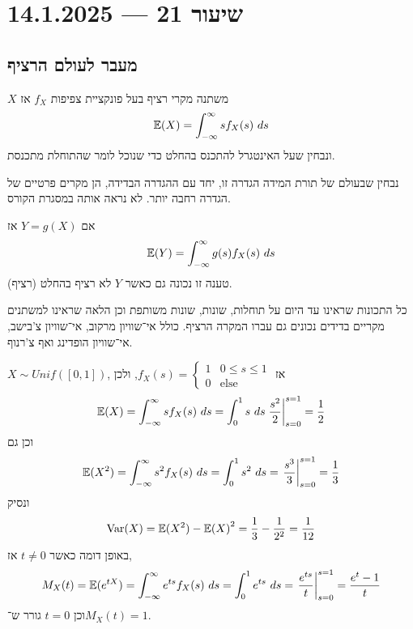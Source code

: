 \section{שיעור 21 --- 14.1.2025}
\subsection{מעבר לעולם הרציף}
\begin{definition}
	$X$ משתנה מקרי רציף בעל פונקציית צפיפות $f_X$ אז
	\[
		\mathbb{E}(X)
		= \int_{-\infty}^{\infty} s f_X(s)\ ds
	\]
	ונבחין שעל האינטגרל להתכנס בהחלט כדי שנוכל לומר שהתוחלת מתכנסת.
\end{definition}
נבחין שבעולם של תורת המידה הגדרה זו, יחד עם ההגדרה הבדידה, הן מקרים פרטיים של הגדרה רחבה יותר. לא נראה אותה במסגרת הקורס.
\begin{proposition}
	אם $Y = g(X)$ אז
	\[
		\mathbb{E}(Y)
		= \int_{-\infty}^{\infty} g(s) f_X(s)\ ds
	\]
	טענה זו נכונה גם כאשר $Y$ לא רציף בהחלט (רציף).
\end{proposition}
כל התכונות שראינו עד היום על תוחלות, שונות, שונות משותפת וכן הלאה שראינו למשתנים מקריים בדידים נכונים גם עברו המקרה הרציף.
כולל אי־שוויון מרקוב, אי־שוויון צ'בישב, אי־שוויון הופדינג ואף צ'רנוף.
\begin{example}
	$X \sim Unif([0, 1])$, אז $f_X(s) = \begin{cases}
		1 & 0 \le s \le 1 \\
		0 & \text{else}
	\end{cases}$, ולכן
	\[
		\mathbb{E}(X)
		= \int_{-\infty}^{\infty} s f_X(s)\ ds
		= \int_0^1 s\ ds
		\left. \frac{s^2}{2} \right\rvert_{s = 0}^{s = 1}
		= \frac{1}{2}
	\]
	וכן גם
	\[
		\mathbb{E}(X^2)
		= \int_{-\infty}^{\infty} s^2 f_X(s)\ ds
		= \int_0^1 s^2\ ds
		= \left. \frac{s^3}{3} \right\rvert_{s = 0}^{s = 1}
		= \frac{1}{3}
	\]
	ונסיק
	\[
		\operatorname{Var}(X)
		= \mathbb{E}(X^2) - {\mathbb{E}(X)}^2
		= \frac{1}{3} - \frac{1}{2^2}
		= \frac{1}{12}
	\]
	באופן דומה כאשר $t \ne 0$ אז,
	\[
		M_X(t)
		= \mathbb{E}(e^{tX})
		= \int_{-\infty}^{\infty} e^{ts} f_X(s)\ ds
		= \int_0^1 e^{ts}\ ds
		= \left. \frac{e^{ts}}{t} \right\rvert_{s = 0}^{s = 1}
		= \frac{e^t - 1}{t}
	\]
	וכן $t = 0$ גורר ש־$M_X(t) = 1$.
\end{example}


